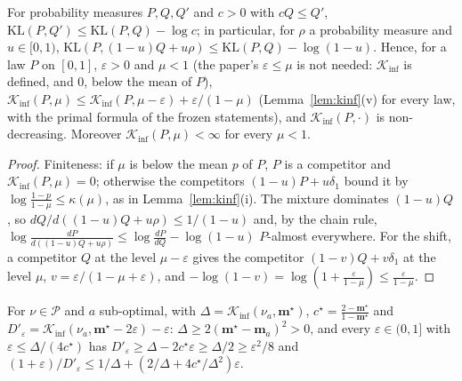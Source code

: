 \documentclass[11pt]{article}
\newcommand{\KL}{\mathrm{KL}}
\newcommand{\Kinf}{\mathcal K_{\inf}}
\newcommand{\cP}{\mathcal P}
\begin{document}
\begin{lemma}[shifting the level of $\Kinf$, primal form]\label{flem:kinf-shift}
For probability measures $P,Q,Q'$ and $c>0$ with $cQ\le Q'$, $\KL(P,Q')\le\KL(P,Q)-\log c$; in particular, for
$\rho$ a probability measure and $u\in[0,1)$, $\KL(P,(1-u)Q+u\rho)\le\KL(P,Q)-\log(1-u)$. Hence, for a law $P$ on
$[0,1]$, $\varepsilon>0$ and $\mu<1$ (the paper's $\varepsilon\le\mu$ is not needed: $\Kinf$ is defined, and $0$, below the
mean of $P$),
$\Kinf(P,\mu)\le\Kinf(P,\mu-\varepsilon)+\varepsilon/(1-\mu)$ (Lemma~\ref{lem:kinf}(v) for every law, with the primal
formula of the frozen statements), and $\Kinf(P,\cdot)$ is non-decreasing. Moreover $\Kinf(P,\mu)<\infty$ for every $\mu<1$.
\end{lemma}

\begin{proof}
Finiteness: if $\mu$ is below the mean $p$ of $P$, $P$ is a competitor and $\Kinf(P,\mu)=0$; otherwise the competitors
$(1-u)P+u\delta_1$ bound it by $\log\frac{1-p}{1-\mu}\le\kappa(\mu)$, as in Lemma~\ref{lem:kinf}(i). The mixture dominates $(1-u)Q$, so $dQ/d((1-u)Q+u\rho)\le1/(1-u)$ and, by the chain rule,
$\log\frac{dP}{d((1-u)Q+u\rho)}\le\log\frac{dP}{dQ}-\log(1-u)$ $P$-almost everywhere. For the shift, a competitor
$Q$ at the level $\mu-\varepsilon$ gives the competitor $(1-v)Q+v\delta_1$ at the level $\mu$,
$v=\varepsilon/(1-\mu+\varepsilon)$, and $-\log(1-v)=\log(1+\frac{\varepsilon}{1-\mu})\le\frac{\varepsilon}{1-\mu}$.
\end{proof}

\begin{lemma}[the final constant when $x=1$]\label{flem:constC-b}
For $\nu\in\cP$ and $a$ sub-optimal, with $\Delta=\Kinf(\nu_a,\mathbf m^\star)$, $c^\star=\frac{2-\mathbf m^\star}{1-\mathbf m^\star}$ and
$D'_\varepsilon=\Kinf(\nu_a,\mathbf m^\star-2\varepsilon)-\varepsilon$: $\Delta\ge2(\mathbf m^\star-\mathbf m_a)^2>0$, and every
$\varepsilon\in(0,1]$ with $\varepsilon\le\Delta/(4c^\star)$ has
$D'_\varepsilon\ge\Delta-2c^\star\varepsilon\ge\Delta/2\ge\varepsilon^2/8$ and
$(1+\varepsilon)/D'_\varepsilon\le1/\Delta+(2/\Delta+4c^\star/\Delta^2)\varepsilon$.
\end{lemma}
\end{document}
